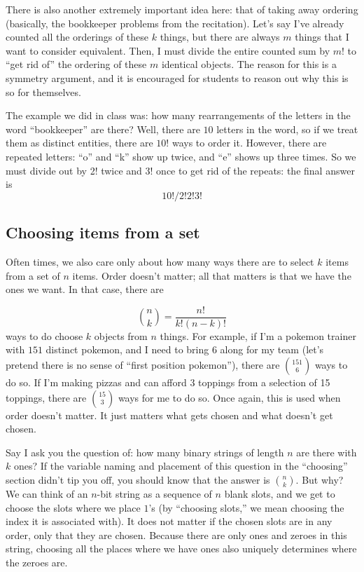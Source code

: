 \documentclass[11pt]{article}
\begin{document}
	There is also another extremely important idea here: that of taking away ordering (basically, the bookkeeper problems from the recitation).  Let's say I've already counted all the orderings
	of these $k$ things, but there are always $m$ things that I want to consider equivalent.  Then, I must divide the entire counted sum by $m!$ to ``get rid of'' the ordering of these $m$ 
	identical objects.  The reason for this is a symmetry argument, and it is encouraged for students to reason out why this is so for themselves.
	
	The example we did in class was: how many rearrangements of the letters in the word ``bookkeeper'' are there?  Well, there are $10$ letters in the word, so if we treat them as distinct
	entities, there are $10!$ ways to order it.  However, there are repeated letters: ``o'' and ``k'' show up twice, and ``e'' shows up three times.  So we must divide out by 2! twice and
	3! once to get rid of the repeats: the final answer is 
	$$10!/2!2!3!$$

\subsection{Choosing items from a set}
	Often times, we also care only about how many ways there are to select $k$ items from a set of $n$ items.  Order doesn't matter; all that matters is that we have the ones we want.  In that
	case, there are
	
	$$\binom{n}{k} = \frac{n!}{k!(n-k)!}$$
	ways to do choose $k$ objects from $n$ things.  For example, if I'm a pokemon trainer with $151$ distinct pokemon, and I need to bring $6$ along for my team (let's pretend there is no 
	sense of
	``first position pokemon''), there are $\binom{151}{6}$ ways to do so.  If I'm making pizzas and can afford 3 toppings from a selection of 15 toppings, there are $\binom{15}{3}$ ways
	for me to do so.  Once again, this is used when order doesn't matter.  It just matters what gets chosen and what doesn't get chosen.
	
	Say I ask you the question of: how many binary strings of length $n$ are there with $k$ ones?  If the variable naming and placement of this question in the ``choosing'' section didn't
	tip you off, you should know that the answer is $\binom{n}{k}$.  But why?  We can think of an $n$-bit string as a sequence of $n$ blank slots, and we get to choose the slots where we
	place $1$'s (by ``choosing slots,'' we mean choosing the index it is associated with).  It does not matter if the chosen slots are in any order, only that they are chosen. Because there are only ones and zeroes in this string, choosing all the places where we have ones also uniquely determines where the zeroes are.
	
\end{document}
